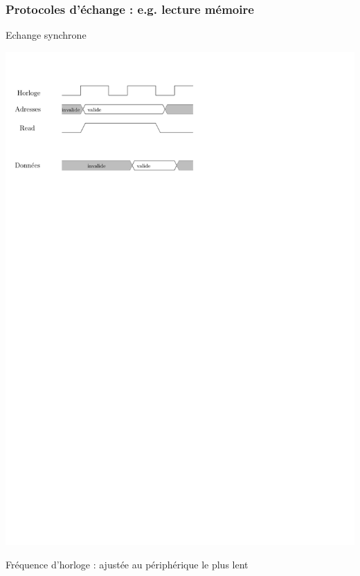 \documentclass{beamer}
\begin{document}
\begin{frame}

\frametitle{Protocoles d'échange : e.g. lecture mémoire}

\begin{block}{Echange synchrone}

\centering\includegraphics[width=0.7\linewidth]{Figs/true_sync_comm.pdf}

\end{block}

Fréquence d'horloge : ajustée au périphérique le plus lent

\end{frame}
\end{document}
